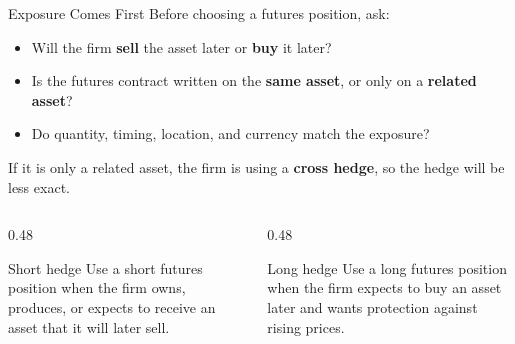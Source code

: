 \documentclass[aspectratio=169,11pt]{beamer}
\begin{document}
\begin{frame}{Exposure Comes First}
    Before choosing a futures position, ask:
    \begin{itemize}
        \item Will the firm \textbf{sell} the asset later or \textbf{buy} it later?
        \item Is the futures contract written on the \textbf{same asset}, or only on a \textbf{related asset}?
        \item Do quantity, timing, location, and currency match the exposure?
    \end{itemize}

    \vspace{0.3em}
    If it is only a related asset, the firm is using a \textbf{cross hedge}, so the hedge will be less exact.

    \vspace{0.7em}
    \begin{columns}[T]
        \begin{column}{0.48\textwidth}
            \begin{block}{Short hedge}
                Use a short futures position when the firm owns, produces, or expects to receive an asset that it will later sell.
            \end{block}
        \end{column}
        \begin{column}{0.48\textwidth}
            \begin{block}{Long hedge}
                Use a long futures position when the firm expects to buy an asset later and wants protection against rising prices.
            \end{block}
        \end{column}
    \end{columns}
\end{frame}
\end{document}
